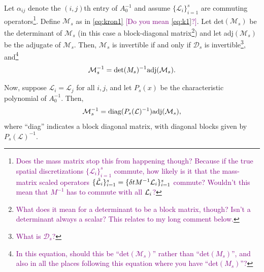 \documentclass[review]{siamart}
\newcommand{\tcp}{\textcolor{purple}}
\begin{document}
%
\begin{lemma}\label{lem:inv}
Let $\alpha_{ij}$ denote the $(i,j)$th entry of $A_0^{-1}$ and assume $\{\mathcal{L}_i\}_{i=1}^s$
are commuting operators\footnote{\tcp{Does the mass matrix stop this from happening though? Because if the true spatial discretizations $\{\mathcal{L}_i\}_{i=1}^s$ commute, how likely is it that the mass-matrix scaled operators $\{ \hat{\cal L}_i \}_{i=1}^s = \{\delta t M^{-1} \mathcal{L}_i\}_{i=1}^s$ commute? Wouldn't this mean that $M^{-1}$ has to commute with all ${\cal L}_i$?}}. Define $\mathcal{M}_s$
as in \eqref{eq:kron1}  \tcp{[Do you mean  \eqref{eq:k1}?]}.
Let det$(\mathcal{M}_s)$ be the determinant of $\mathcal{M}_s$ (in this case a block-diagonal
matrix\footnote{\tcp{What does it mean for a determinant to be a block matrix, though? Isn't a determinant always a scalar? This relates to my long comment below.}}) and let adj$(\mathcal{M}_s)$ be the adjugate of $\mathcal{M}_s$. Then, $\mathcal{M}_s$
is invertible if and only if $\mathcal{D}_s$ is invertible\footnote{\tcp{What is $\mathcal{D}_s$?}}, and\footnote{\tcp{In this equation, should this be ``det$(\mathcal{M}_s)$'' rather than ``det$({M}_s)$'', and also in all the places following this equation where you have ``det$({M}_s)$''?}}
\begin{align*}
\mathcal{M}_s^{-1} = \textnormal{det}({M}_s)^{-1}\textnormal{adj}(\mathcal{M}_s).
\end{align*}{}

Now, suppose $\mathcal{L}_i = \mathcal{L}_j$ for all $i,j$, and let $P_s(x)$ be the
characteristic polynomial of $A_0^{-1}$. Then,
\begin{align*}
\mathcal{M}_s^{-1} = \textnormal{diag}(P_s(\mathcal{L})^{-1})\textnormal{adj}(\mathcal{M}_s),
\end{align*}
where ``diag'' indicates a block diagonal matrix, with diagonal blocks given by $P_s(\mathcal{L})^{-1}$.
\end{lemma}
\end{document}
